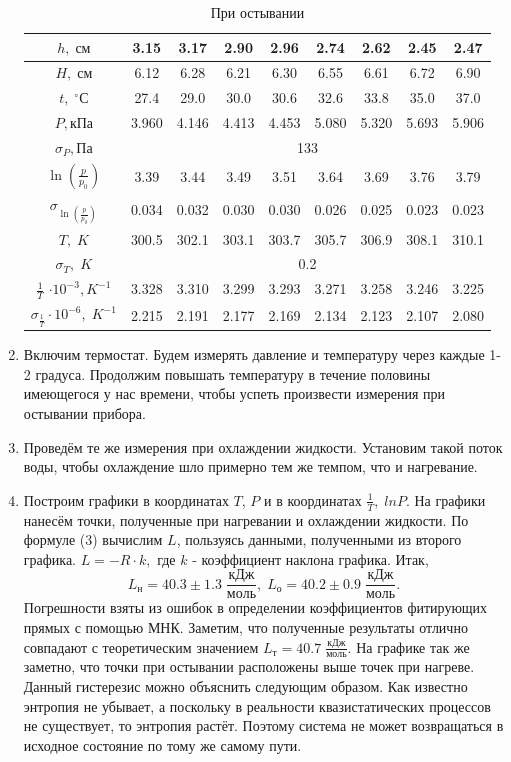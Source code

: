 \documentclass[a4paper,12pt]{article}
\begin{document}
\begin{enumerate}
\begin{center}
\begin{table}[h]
\begin{tabular}{|c|c|c|c|c|c|c|c|c|}
	\hline 
	$h ,\; {см}$ &  3.15 & 3.17 & 2.90 & 2.96 & 2.74 & 2.62 & 2.45 & 2.47    \\ 
	\hline 
	$H, \; {см}$ &  6.12  &6.28  & 6.21 & 6.30 & 6.55 & 6.61 & 6.72 & 6.90    \\ 
	\hline 
	$t, \; ^\circ С$ &  27.4  & 29.0 & 30.0 & 30.6 & 32.6 & 33.8 & 35.0 & 37.0   \\ 
	\hline 
	$P, {кПа}$ &  3.960  & 4.146 & 4.413 & 4.453 & 5.080& 5.320 & 5.693 & 5.906 \\ 
	\hline 
	$\sigma_{P}, {Па}$  & \multicolumn{8}{|c|}{133}  \\
	\hline
	$\ln(\frac {p}{p_0})$ & 3.39  & 3.44 & 3.49 & 3.51 & 3.64 & 3.69 & 3.76 & 3.79 \\ 
	\hline 
	$\sigma_{\ln(\frac {p}{p_0})}$ & 0.034 &  0.032 & 0.030 & 0.030  & 0.026 & 0.025 & 0.023 & 0.023 \\ 
	\hline
	$T , \; {K}$ & 300.5  & 302.1 & 303.1 & 303.7 & 305.7 & 306.9 & 308.1 & 310.1 \\ 
	\hline
	$\sigma_{T},\; {K}$ & \multicolumn{8}{|c|}{0.2} \\
	\hline
	$\frac{1}{T}$ $\cdot 10^{-3},{K}^{-1}$ & 3.328 & 3.310 & 3.299 & 3.293 & 3.271 & 3.258 & 3.246 & 3.225 \\ 
	\hline 
	$\sigma_{\frac{1}{T}} \cdot 10^{-6}, \; {K}^{-1}$   & 2.215  & 2.191 & 2.177 & 2.169 & 2.134 & 2.123 &  2.107 & 2.080 \\ 
	\hline
\end{tabular} 
	\caption{При остывании}
\end{table}
\end{center}


\item Включим термостат. Будем измерять давление и температуру через каждые 1-2 градуса. Продолжим повышать температуру в течение половины имеющегося у нас времени, чтобы успеть произвести измерения при остывании прибора.
\item Проведём те же измерения при охлаждении жидкости.
Установим такой поток воды, чтобы охлаждение шло примерно тем же темпом, что и нагревание.
\item Построим графики в координатах $T$, $P$ и в координатах $\frac{1}{T}, \; ln P$. На графики нанесём точки, полученные при нагревании и охлаждении жидкости. По формуле (3) вычислим $L$, пользуясь данными, полученными  из второго графика.
$L = -R \cdot k,$ где $k$ - коэффициент наклона графика. Итак, $$L_н = 40.3 \pm 1.3 \; \frac{кДж}{моль}, \; L_о = 40.2 \pm 0.9 \; \frac{кДж}{моль}.$$ Погрешности взяты из ошибок в определении коэффициентов фитирующих прямых с помощью МНК. Заметим, что полученные результаты отлично совпадают с теоретическим значением $L_т = 40.7 \; \frac{кДж}{моль}.$ На графике так же заметно, что точки  при остывании расположены выше точек при нагреве. Данный гистерезис можно объяснить следующим образом. Как известно энтропия не убывает, а поскольку в реальности квазистатических процессов не существует, то энтропия растёт. Поэтому система не может возвращаться в исходное состояние по тому же самому пути.
 

\end{enumerate}
\end{document}
